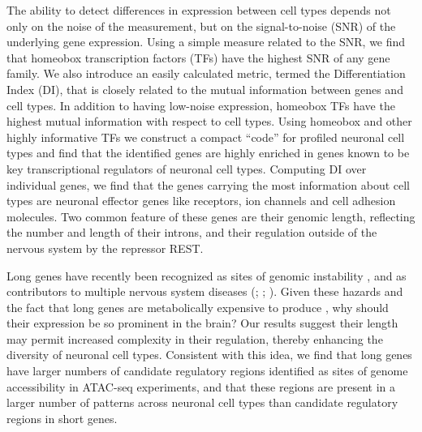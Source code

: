 The ability to detect differences in expression between cell types depends not only on the noise of the measurement, but on the signal-to-noise (SNR) of the underlying gene expression. Using a simple measure related to the SNR, we find that homeobox transcription factors (TFs) have the highest SNR of any gene family. We also introduce an easily calculated metric, termed the Differentiation Index (DI), that is closely related to the mutual information between genes and cell types. In addition to having low-noise expression, homeobox TFs have the highest mutual information with respect to cell types. Using homeobox and other highly informative TFs we construct a compact “code” for profiled neuronal cell types and find that the identified genes are highly enriched in genes known to be key transcriptional regulators of neuronal cell types.
Computing DI over individual genes, we find that the genes carrying the most information about cell types are neuronal effector genes like receptors, ion channels and cell adhesion molecules. Two common feature of these genes are their genomic length, reflecting the number and length of their introns, and their regulation outside of the nervous system by the repressor REST.

Long genes have recently been recognized as sites of genomic instability \cite{Wei_2016}, and as contributors to multiple nervous system diseases (\cite{Sugino_2014}; \cite{Gabel_2015}; \cite{Zylka_2015}). Given these hazards and the fact that long genes are metabolically expensive to produce \cite{Castillo_Davis_2002}, why should their expression be so prominent in the brain? Our results suggest their length may permit increased complexity in their regulation, thereby enhancing the diversity of neuronal cell types. Consistent with this idea, we find that long genes have larger numbers of candidate regulatory regions identified as sites of genome accessibility in ATAC-seq experiments, and that these regions are present in a larger number of patterns across neuronal cell types than candidate regulatory regions in short genes.
